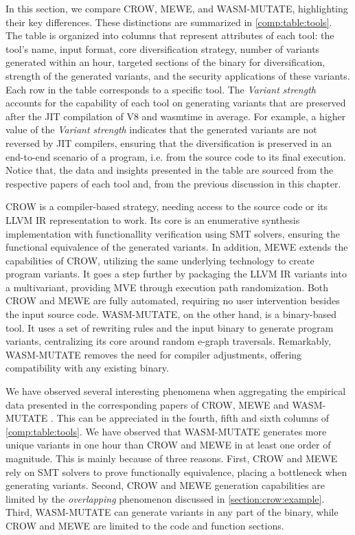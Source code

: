 
\label{discussion}

In this section, we compare CROW, MEWE, and WASM-MUTATE, highlighting their key differences. 
These distinctions are summarized in \autoref{comp:table:tools}. 
The table is organized into columns that represent attributes of each tool: the tool's name, input format, core diversification strategy, number of variants generated within an hour, targeted sections of the \Wasm binary for diversification, strength of the generated variants, and the security applications of these variants. 
Each row in the table corresponds to a specific tool. 
The \emph{Variant strength} accounts for the capability of each tool on generating variants that are preserved after the JIT compilation of V8 and wasmtime in average.
For example, a higher value of the \emph{Variant strength} indicates that the generated variants are not reversed by JIT compilers, ensuring that the diversification is preserved in an end-to-end scenario of a \Wasm program, i.e. from the source code to its final execution.
Notice that, the data and insights presented in the table are sourced from the respective papers of each tool and, from the previous discussion in this chapter.


CROW is a compiler-based strategy, needing access to the source code or its LLVM IR representation to work. 
Its core is an enumerative synthesis implementation with functionallity verification using SMT solvers, ensuring the functional equivalence of the generated variants.
In addition, MEWE extends the capabilities of CROW, utilizing the same underlying technology to create program variants. 
It goes a step further by packaging the LLVM IR variants into a  \Wasm multivariant, providing MVE through execution path randomization.
Both CROW and MEWE are fully automated, requiring no user intervention besides the input source code.
WASM-MUTATE, on the other hand, is a binary-based tool.
It uses a set of rewriting rules and the input \wasm binary to generate program variants, centralizing its core around random e-graph traversals. 
Remarkably, WASM-MUTATE removes the need for compiler adjustments, offering compatibility with any existing \Wasm binary. 


We have observed several interesting phenomena when aggregating the empirical data presented in the corresponding papers of CROW, MEWE and WASM-MUTATE \cite{CROW,MEWE, wasmmutate}. 
This can be appreciated in the fourth, fifth and sixth columns of \autoref{comp:table:tools}.
We have observed that WASM-MUTATE generates more unique variants in one hour than CROW and MEWE in at least one order of magnitude.
This is mainly because of three reasons.
First, CROW and MEWE rely on SMT solvers to prove functionally equivalence, placing a bottleneck when generating variants.
Second, CROW and MEWE generation capabilities are limited by the \emph{overlapping} phenomenon discussed in \autoref{section:crow:example}.
Third, WASM-MUTATE can generate variants in any part of the \wasm binary, while CROW and MEWE are limited to the code and function sections.


